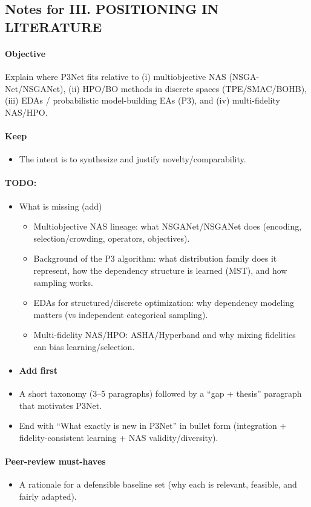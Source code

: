 \subsection*{Notes for III. POSITIONING IN LITERATURE}
\paragraph{Objective}
Explain where P3Net fits relative to (i) multiobjective NAS (NSGA-Net/NSGANet), (ii) HPO/BO methods in discrete spaces (TPE/SMAC/BOHB), (iii) EDAs / probabilistic model-building EAs (P3), and (iv) multi-fidelity NAS/HPO.

\paragraph{Keep}
\begin{itemize}
  \item The intent is to synthesize and justify novelty/comparability.
\end{itemize}

\paragraph{TODO:}
\begin{itemize}
    \item What is missing (add)
\begin{itemize}
  \item Multiobjective NAS lineage: what NSGANet/NSGANet does (encoding, selection/crowding, operators, objectives).
  \item Background of the P3 algorithm: what distribution family does it represent, how the dependency structure is learned (MST), and how sampling works.
  \item EDAs for structured/discrete optimization: why dependency modeling matters (vs independent categorical sampling).
  \item Multi-fidelity NAS/HPO: ASHA/Hyperband and why mixing fidelities can bias learning/selection.
\end{itemize}
\end{itemize}
\begin{itemize}
    \item \paragraph{Add first}
\end{itemize}
\begin{itemize}
  \begin{itemize}
      \item A short taxonomy (3--5 paragraphs) followed by a “gap + thesis” paragraph that motivates P3Net.
      \item End with “What exactly is new in P3Net” in bullet form (integration + fidelity-consistent learning + NAS validity/diversity).
  \end{itemize}
\end{itemize}

\paragraph{Peer-review must-haves}
\begin{itemize}
  \item A rationale for a defensible baseline set (why each is relevant, feasible, and fairly adapted).
\end{itemize}
